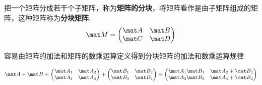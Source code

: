 

把一个矩阵分成若干个子矩阵，称为\textbf{矩阵的分块}，将矩阵看作是由子矩阵组成的矩阵，这种矩阵称为\textbf{分块矩阵}.
\[
\mat M=
\begin{pmatrix}
\mat A & \mat B\\
\mat C & \mat D
\end{pmatrix}
\]

容易由矩阵的加法和矩阵的数乘运算定义得到分块矩阵的加法和数乘运算规律

\begin{equation}
\mat A+\mat B=
\begin{pmatrix}
\mat A_1 & \mat A_2\\
\mat A_3 & \mat A_4
\end{pmatrix}
+
\begin{pmatrix}
\mat B_1 & \mat B_2\\
\mat B_3 & \mat B_4
\end{pmatrix}
=
\begin{pmatrix}
\mat A_1\mat B_1 & \mat A_2+\mat B_2\\
\mat A_3 \mat B_3 & \mat A_4+\mat B_4
\end{pmatrix}
\end{equation}